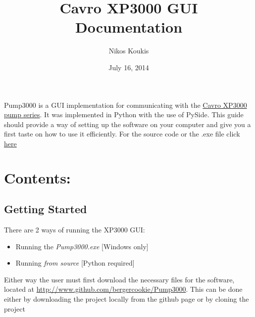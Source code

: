 \documentclass[letterpaper,10pt,english]{sphinxmanual}
\title{Cavro XP3000 GUI Documentation}
\date{July 16, 2014}
\author{Nikos Koukis}
\begin{document}
\maketitle
\tableofcontents
{}\label{index::doc}


Pump3000 is a GUI implementation for communicating with the \href{http://cladlab.com/download/electronics/teardowns/cavro-xl3000/cavro-xp3000-syringe-pump-operators-manual.pdf}{Cavro XP3000 pump series}.
It was implemented in Python with the use of PySide.
This guide should provide a way of setting up the software on your computer and
give you a first taste on how to use it efficiently.
For the source code or the .exe file click \href{http://www.github.com/bergercookie/Pump3000}{here}


\chapter{Contents:}
\label{index:guide-to-pump3000}\label{index:contents}

\section{Getting Started}
\label{getting-started:getting-started}\label{getting-started::doc}
There are 2 ways of running the XP3000 GUI:
\begin{itemize}
\item {} 
Running the \emph{Pump3000.exe} {[}Windows only{]}

\item {} 
Running \emph{from source} {[}Python required{]}

\end{itemize}

Either way the user must first download the necessary files for the software,
located at \href{http://www.github.com/bergercookie/Pump3000}{http://www.github.com/bergercookie/Pump3000}. This can be
done either by downloading the project locally from the github page or by cloning the project
\end{document}
